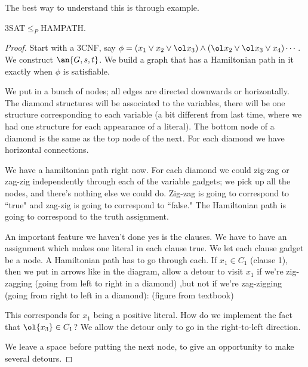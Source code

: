 \vskip0.15in
The best way to understand this is through example.
\begin{thm}
3SAT$\le_P$HAMPATH.
\end{thm}
\begin{proof}
Start with a 3CNF, say $\phi=(x_1\vee x_2\vee \ol x_3)\wedge (\ol x_2\vee \ol x_3\vee x_4)\cdots$. We construct $\an{G,s,t}$. We build a graph that has a Hamiltonian path in it exactly when $\phi$ is satisfiable. 

We put in a bunch of nodes; all edges are directed downwards or horizontally. The diamond structures will be associated to the variables, there will be one structure corresponding to each variable (a bit different from last time, where we had one structure for each appearance of a literal). The bottom node of a diamond is the same as the top node of the next. For each diamond we have horizontal connections. 

We have a hamiltonian path right now. For each diamond we could zig-zag or zag-zig independently through each of the variable gadgets; we pick up all the nodes, and there's nothing else we could do. Zig-zag is going to correspond to ``true" and zag-zig is going to correspond to ``false." The Hamiltonian path is going to correspond to the truth assignment.

An important feature we haven't done yes is the clauses. We have to have an assignment which makes one literal in each clause true. We let each clause gadget be a node.  A Hamiltonian path has to go through each. If $x_1\in C_1$ (clause 1), then we put in arrows like in the diagram, allow a detour to visit $x_1$ if we're zig-zagging (going from left to right in a diamond) ,but not if we're zag-zigging (going from right to left in a diamond): (figure from textbook)


This corresponds for $x_1$ being a positive literal. How do we implement the fact that $\ol{x_3}\in C_1$? We allow the detour only to go in the right-to-left direction.


We leave a space before putting the next node, to give an opportunity to make several detours.


\end{proof}
